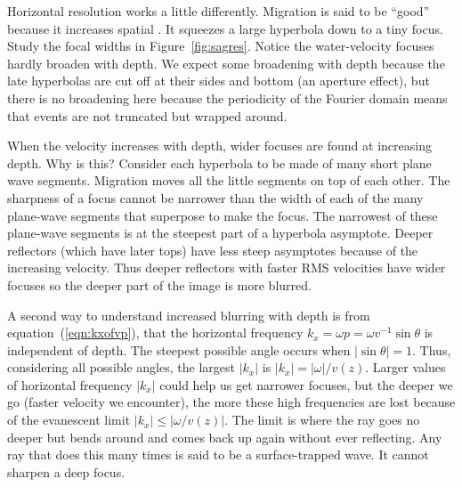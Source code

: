 \par
Horizontal resolution works a little differently.
Migration is said to be ``good'' because it increases spatial .
It squeezes a large hyperbola down to a tiny focus.
Study the focal widths in Figure~\ref{fig:sagres}. %
Notice the water-velocity focuses hardly broaden with depth.
We expect some broadening with depth because the late
hyperbolas are cut off at their sides and bottom
(an aperture effect),
but there is no broadening here
because the periodicity of the Fourier domain
means that events are not truncated but wrapped around.
%
\par
When the velocity increases with depth,
wider focuses are found at increasing depth.
Why is this?
Consider each hyperbola to be made of many short plane wave segments.
Migration moves all the little segments on top of each other.
The sharpness of a focus cannot be narrower
than the width of each of the many plane-wave segments
that superpose to make the focus.
The narrowest of these plane-wave segments
is at the steepest part of a hyperbola asymptote.
Deeper reflectors (which have later tops)
have less steep asymptotes because
of the increasing velocity.
Thus deeper reflectors with faster RMS velocities have wider focuses
so the deeper part of the image is more blurred.


A second way to understand increased blurring with depth
is from equation~(\ref{eqn:kxofvp}),
that the horizontal frequency $k_x=\omega p = \omega v^{-1}\sin\theta$
is independent of depth.
The steepest possible angle occurs when $|\sin\theta| = 1$.
Thus, considering all possible angles,
the largest $|k_x|$ is $|k_x|=|\omega|/v(z)$.
Larger values of horizontal frequency $|k_x|$
could help us get narrower focuses,
but the deeper we go (faster velocity we encounter),
the more these high frequencies are lost
because of the evanescent limit $|k_x|\le |\omega/v(z)|$.
The limit is where the ray goes no deeper but bends around and
comes back up again without ever reflecting.
Any ray that does this many times is said to be a surface-trapped wave.
It cannot sharpen a deep focus.

